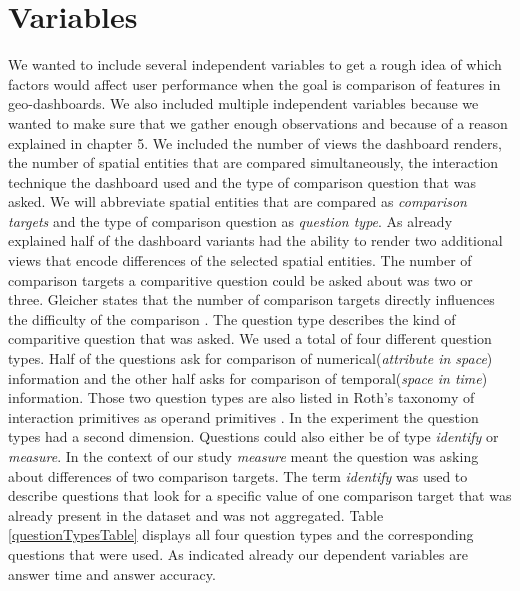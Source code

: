 \section{Variables}
We wanted to include several independent variables to get a rough idea of which factors would affect user performance when the goal
is comparison of features in geo-dashboards. We also included multiple independent variables because we wanted to make sure that we gather
enough observations and because of a reason explained in chapter 5.
We included the number of views the dashboard renders, the number of spatial entities that are compared simultaneously,
the interaction technique the dashboard used and the type of comparison question that was asked. We will abbreviate spatial
entities that are compared as \textit{comparison targets} and the type of comparison question as \textit{question type}. As already
explained half of the dashboard variants had the ability to render two additional views that encode differences of the selected spatial entities.
The number of comparison targets a comparitive question could be asked about was two or three. Gleicher states that the number of comparison targets
directly influences the difficulty of the comparison \citep*{Gleicher.2018}. The question type describes the kind of comparitive question
that was asked. We used a total of four different question types. Half of the questions ask for comparison of numerical(\textit{attribute in space})
information and the other half asks for comparison of temporal(\textit{space in time}) information. Those two question types are also listed
in Roth's taxonomy of interaction primitives as operand primitives \citep*{Roth.2013}. In the experiment the question types had a second dimension.
Questions could also either be of type \textit{identify} or \textit{measure}. In the context of our study \textit{measure} meant the question was asking
about differences of two comparison targets. The term \textit{identify} was used to describe questions that look for a specific value of one
comparison target that was already present in the dataset and was not aggregated. Table \ref{questionTypesTable} displays all four question types and
the corresponding questions that were used.
As indicated already our dependent variables are answer time and answer accuracy.

